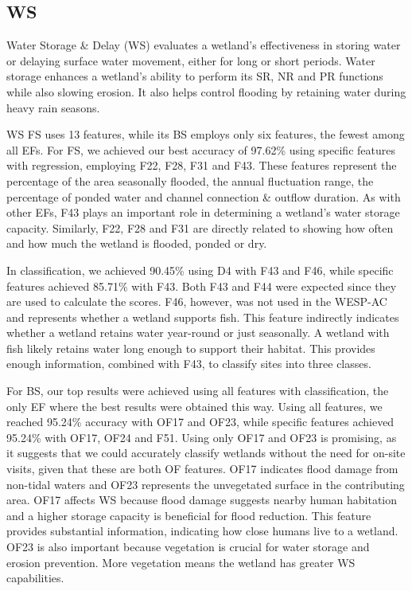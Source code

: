 \documentclass[12pt,letterpaper]{article}
\begin{document}
\subsection{WS}
Water Storage \& Delay (\ac{WS}) evaluates a wetland's effectiveness in storing water or delaying surface water movement, either for long or short periods.
Water storage enhances a wetland's ability to perform its \ac{SR}, \ac{NR} and \ac{PR} functions while also slowing erosion.
It also helps control flooding by retaining water during heavy rain seasons.

\ac{WS} \ac{FS} uses 13 features, while its \ac{BS} employs only six features, the fewest among all \ac{EF}s.
For \ac{FS}, we achieved our best accuracy of 97.62\% using specific features with regression, employing F22, F28, F31 and F43.
These features represent the percentage of the area seasonally flooded, the annual fluctuation range, the percentage of ponded water and channel connection \& outflow duration.
As with other \ac{EF}s, F43 plays an important role in determining a wetland's water storage capacity.
Similarly, F22, F28 and F31 are directly related to showing how often and how much the wetland is flooded, ponded or dry.

In classification, we achieved 90.45\% using D4 with F43 and F46, while specific features achieved 85.71\% with F43.
Both F43 and F44 were expected since they are used to calculate the scores.
F46, however, was not used in the \ac{WESP-AC} and represents whether a wetland supports fish.
This feature indirectly indicates whether a wetland retains water year-round or just seasonally.
A wetland with fish likely retains water long enough to support their habitat.
This provides enough information, combined with F43, to classify sites into three classes.

For \ac{BS}, our top results were achieved using all features with classification, the only \ac{EF} where the best results were obtained this way.
Using all features, we reached 95.24\% accuracy with OF17 and OF23, while specific features achieved 95.24\% with OF17, OF24 and F51.
Using only OF17 and OF23 is promising, as it suggests that we could accurately classify wetlands without the need for on-site visits, given that these are both OF features.
OF17 indicates flood damage from non-tidal waters and OF23 represents the unvegetated surface in the contributing area.
OF17 affects \ac{WS} because flood damage suggests nearby human habitation and a higher storage capacity is beneficial for flood reduction.
This feature provides substantial information, indicating how close humans live to a wetland.
OF23 is also important because vegetation is crucial for water storage and erosion prevention.
More vegetation means the wetland has greater \ac{WS} capabilities.
\end{document}
